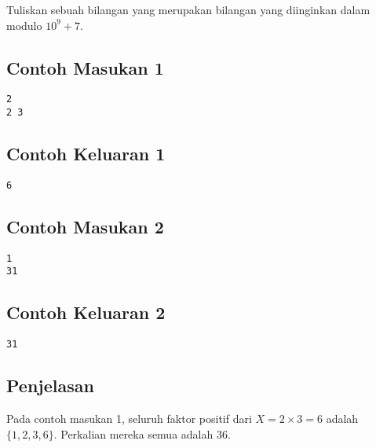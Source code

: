 \documentclass{article}
\begin{document}
Tuliskan sebuah bilangan yang merupakan bilangan yang diinginkan dalam modulo $10^9 + 7$.
\\

\begin{multicols}{2}
\subsection*{Contoh Masukan 1}
\begin{lstlisting}
2
2 3
\end{lstlisting}
\columnbreak
\subsection*{Contoh Keluaran 1}
\begin{lstlisting}
6
\end{lstlisting}
\vfill
\null
\end{multicols}

\begin{multicols}{2}
\subsection*{Contoh Masukan 2}
\begin{lstlisting}
1
31
\end{lstlisting}
\columnbreak
\subsection*{Contoh Keluaran 2}
\begin{lstlisting}
31
\end{lstlisting}
\vfill
\null
\end{multicols}

\subsection*{Penjelasan}
Pada contoh masukan 1, seluruh faktor positif dari $X = 2 \times 3 = 6$ adalah $\{ 1,2,3,6 \}$. Perkalian mereka semua adalah $36$.

\pagebreak
\end{document}
